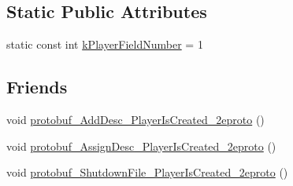 \subsection*{Static Public Attributes}
\begin{DoxyCompactItemize}
\item 
static const int \hyperlink{class_player_is_created_a3269ef8e31ed0329f9f23b97d8cf10c2}{k\-Player\-Field\-Number} = 1
\end{DoxyCompactItemize}
\subsection*{Friends}
\begin{DoxyCompactItemize}
\item 
void \hyperlink{class_player_is_created_ae862a255429cc902c40be8c48190da6d}{protobuf\-\_\-\-Add\-Desc\-\_\-\-Player\-Is\-Created\-\_\-2eproto} ()
\item 
void \hyperlink{class_player_is_created_af53655c5ff0c55c3693040c9e8b18236}{protobuf\-\_\-\-Assign\-Desc\-\_\-\-Player\-Is\-Created\-\_\-2eproto} ()
\item 
void \hyperlink{class_player_is_created_a99057acd602b2ff282b248946616369b}{protobuf\-\_\-\-Shutdown\-File\-\_\-\-Player\-Is\-Created\-\_\-2eproto} ()
\end{DoxyCompactItemize}


